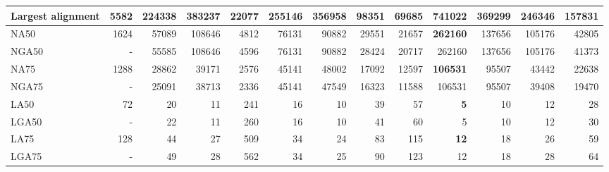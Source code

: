 \documentclass[12pt,a4paper]{article}
\begin{document}
\begin{table}[ht]
\begin{center}
\begin{tabular}{|l*{12}{|r}|}
Largest alignment & 5582 & 224338 & 383237 & 22077 & 255146 & 356958 & 98351 & 69685 & {\bf 741022} & 369299 & 246346 & 157831 \\ \hline
NA50 & 1624 & 57089 & 108646 & 4812 & 76131 & 90882 & 29551 & 21657 & {\bf 262160} & 137656 & 105176 & 42805 \\ \hline
NGA50 & - & 55585 & 108646 & 4596 & 76131 & 90882 & 28424 & 20717 & 262160 & 137656 & 105176 & 41373 \\ \hline
NA75 & 1288 & 28862 & 39171 & 2576 & 45141 & 48002 & 17092 & 12597 & {\bf 106531} & 95507 & 43442 & 22638 \\ \hline
NGA75 & - & 25091 & 38713 & 2336 & 45141 & 47549 & 16323 & 11588 & 106531 & 95507 & 39408 & 19470 \\ \hline
LA50 & 72 & 20 & 11 & 241 & 16 & 10 & 39 & 57 & {\bf 5} & 10 & 12 & 28 \\ \hline
LGA50 & - & 22 & 11 & 260 & 16 & 10 & 41 & 60 & 5 & 10 & 12 & 30 \\ \hline
LA75 & 128 & 44 & 27 & 509 & 34 & 24 & 83 & 115 & {\bf 12} & 18 & 26 & 59 \\ \hline
LGA75 & - & 49 & 28 & 562 & 34 & 25 & 90 & 123 & 12 & 18 & 28 & 64 \\ \hline
\end{tabular}
\end{center}
\end{table}
\end{document}
